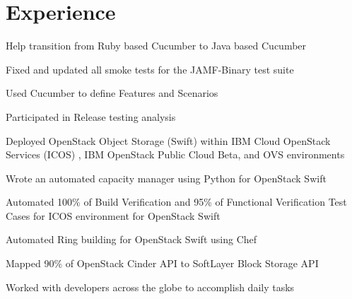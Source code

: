 \documentclass[letterpaper]{resume} %
\begin{document}
\hfill
%
%
\begin{minipage}[t]{0.66\textwidth} %


\section{Experience}

\vspace{\topsep} %
\begin{tightitemize}
\item Help transition from Ruby based Cucumber to Java based Cucumber
\item Fixed and updated all smoke tests for the JAMF-Binary test suite
\item Used Cucumber to define Features and Scenarios
\item Participated in Release testing analysis
\end{tightitemize}

\sectionspace %

\begin{tightitemize}
\item Deployed OpenStack Object Storage (Swift) within IBM Cloud OpenStack Services (ICOS) , IBM OpenStack Public Cloud Beta, and OVS environments
\item Wrote an automated capacity manager using Python for OpenStack Swift
\item Automated 100\% of Build Verification and 95\% of Functional Verification Test Cases for ICOS environment for OpenStack Swift
\item Automated Ring building for OpenStack Swift using Chef
\item Mapped 90\% of OpenStack Cinder API to SoftLayer Block Storage API
\item Worked with developers across the globe to accomplish daily tasks
\end{tightitemize}


\end{minipage}
\end{document}

